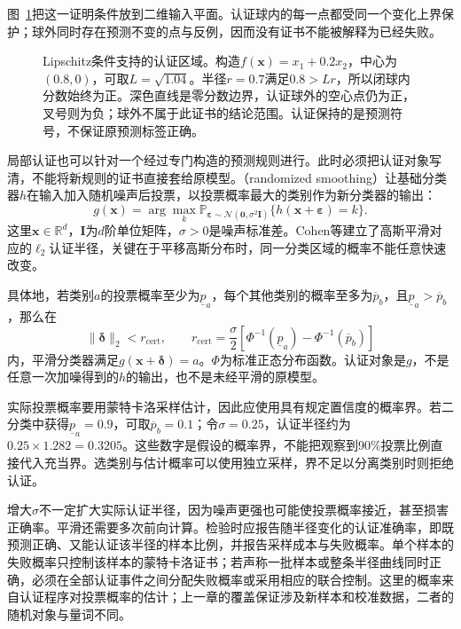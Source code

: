 图~\ref{fig:trust-certified-region}把这一证明条件放到二维输入平面。认证球内的每一点都受同一个变化上界保护；球外同时存在预测不变的点与反例，因而没有证书不能被解释为已经失败。

\begin{figure}[!htb]
  \centering
  
  \caption{Lipschitz条件支持的认证区域。构造$f(\bm x)=x_1+0.2x_2$，中心为$(0.8,0)$，可取$L=\sqrt{1.04}$。半径$r=0.7$满足$0.8>Lr$，所以闭球内分数始终为正。深色直线是零分数边界，认证球外的空心点仍为正，叉号则为负；球外不属于此证书的结论范围。认证保持的是预测符号，不保证原预测标签正确。}
  \label{fig:trust-certified-region}
\end{figure}

局部认证也可以针对一个经过专门构造的预测规则进行。此时必须把认证对象写清，不能将新规则的证书直接套给原模型。（randomized smoothing）让基础分类器$h$在输入加入随机噪声后投票，以投票概率最大的类别作为新分类器的输出：
\begin{equation}
 g(\bm{x})=\arg\max_k
   \mathbb P_{\bm{\varepsilon}\sim
   \mathcal N(\bm{0},\sigma^2\bm I)}
   \{h(\bm{x}+\bm{\varepsilon})=k\}.
 \label{eq:robustness-smoothing}
\end{equation}
这里$\bm{x}\in\mathbb R^d$，$\bm I$为$d$阶单位矩阵，$\sigma>0$是噪声标准差。Cohen等建立了高斯平滑对应的$\ell_2$认证半径，关键在于平移高斯分布时，同一分类区域的概率不能任意快速改变。

具体地，若类别$a$的投票概率至少为$\underline p_a$，每个其他类别的概率至多为$\overline p_b$，且$\underline p_a>\overline p_b$，那么在
\begin{equation}
 \lVert\bm{\delta}\rVert_2<r_{\mathrm{cert}},
 \qquad
 r_{\mathrm{cert}}
 =\frac{\sigma}{2}
 \left[\Phi^{-1}(\underline p_a)
       -\Phi^{-1}(\overline p_b)\right]
 \label{eq:robustness-smoothing-radius}
\end{equation}
内，平滑分类器满足$g(\bm{x}+\bm{\delta})=a$。$\Phi$为标准正态分布函数。认证对象是$g$，不是任意一次加噪得到的$h$的输出，也不是未经平滑的原模型。

实际投票概率要用蒙特卡洛采样估计，因此应使用具有规定置信度的概率界。若二分类中获得$\underline p_a=0.9$，可取$\overline p_b=0.1$；令$\sigma=0.25$，认证半径约为$0.25\times1.282=0.3205$。这些数字是假设的概率界，不能把观察到90\%投票比例直接代入充当界。选类别与估计概率可以使用独立采样，界不足以分离类别时则拒绝认证。

增大$\sigma$不一定扩大实际认证半径，因为噪声更强也可能使投票概率接近，甚至损害正确率。平滑还需要多次前向计算。检验时应报告随半径变化的认证准确率，即既预测正确、又能认证该半径的样本比例，并报告采样成本与失败概率。单个样本的失败概率只控制该样本的蒙特卡洛证书；若声称一批样本或整条半径曲线同时正确，必须在全部认证事件之间分配失败概率或采用相应的联合控制。这里的概率来自认证程序对投票概率的估计；上一章的覆盖保证涉及新样本和校准数据，二者的随机对象与量词不同。

